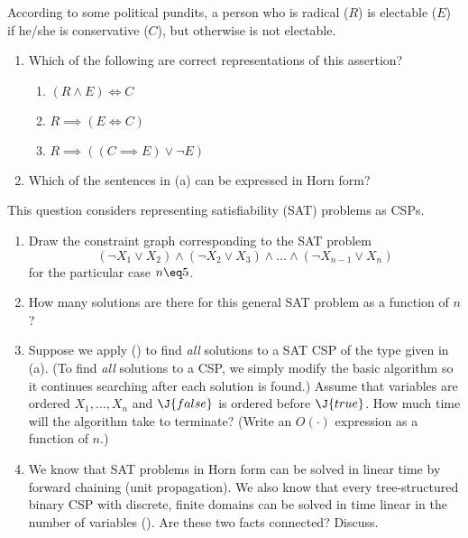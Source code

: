 \begin{exercise}%
According to some political pundits, a person who is radical (\(R\)) is electable (\(E\))
if he/she is conservative (\(C\)), but otherwise is not electable.
\begin{enumerate}
\item  Which of the following are correct representations of this assertion?
\begin{enumerate}
\item \((R\land E)\iff C\) 
\item \(R\implies (E\iff C)\) 
\item \(R\implies ((C\implies E) \lor \lnot E)\) 
\end{enumerate}
\item  Which of the sentences in (a) can be expressed in Horn form?
\end{enumerate}
\end{exercise} 

\begin{uexercise}%
This question considers representing satisfiability
(SAT) problems as CSPs.
\begin{enumerate}
\item  Draw the constraint graph corresponding to the SAT problem
\[
  (\lnot X_1 \lor X_2) \land (\lnot X_2 \lor X_3) \land \ldots \land (\lnot X_{n-1} \lor X_n)
\]
for the particular case \(n\eq 5\).
\item  How many solutions are there for this general SAT problem as a function of \(n\)?
\item  Suppose we apply  () to find {\em all} solutions
to a SAT CSP of the type given in (a). (To find {\em all} solutions to a CSP, we simply modify
the basic algorithm so it continues searching after each solution is found.)
Assume that variables are ordered \(X_1,\ldots,X_n\) and \(\J{false}\) is ordered before \(\J{true}\).
How much time will the algorithm take to terminate? (Write an \(O(\cdot)\) expression as a function of \(n\).)
\item  We know that SAT problems in Horn form can be solved in linear time by forward chaining (unit propagation).
We also know that every tree-structured binary CSP with discrete, finite domains can be solved in time linear in the number of variables ().
Are these two facts connected? Discuss.
\end{enumerate}
\end{uexercise} 

